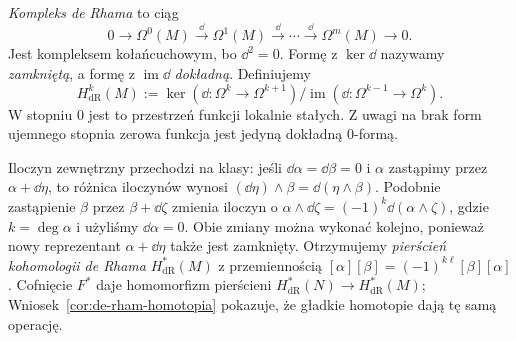 \begin{definicja}
\label{def:de-rham-cohomology}
\emph{Kompleks de Rhama} to ciąg
\[
 0\longrightarrow\Omega^0(M)\xrightarrow{\dd}
 \Omega^1(M)\xrightarrow{\dd}\cdots
 \xrightarrow{\dd}\Omega^m(M)\longrightarrow0.
\]
Jest kompleksem kołańcuchowym, bo $\dd^2=0$.
Formę z $\ker\dd$ nazywamy \emph{zamkniętą},
a formę z $\operatorname{im}\dd$ \emph{dokładną}. Definiujemy
\[
 H^k_{\mathrm{dR}}(M)
 :=\ker(\dd:\Omega^k\to\Omega^{k+1})/
   \operatorname{im}(\dd:\Omega^{k-1}\to\Omega^k).
\]
W stopniu $0$ jest to przestrzeń funkcji lokalnie stałych.
Z uwagi na brak form ujemnego stopnia zerowa funkcja
jest jedyną dokładną $0$-formą.
\end{definicja}

Iloczyn zewnętrzny przechodzi na klasy: jeśli
$\dd\alpha=\dd\beta=0$ i $\alpha$ zastąpimy przez
$\alpha+\dd\eta$, to różnica iloczynów wynosi
$(\dd\eta)\wedge\beta=\dd(\eta\wedge\beta)$.
Podobnie zastąpienie $\beta$ przez $\beta+\dd\zeta$
zmienia iloczyn o
$\alpha\wedge\dd\zeta=(-1)^k\dd(\alpha\wedge\zeta)$,
gdzie $k=\deg\alpha$ i użyliśmy $\dd\alpha=0$.
Obie zmiany można wykonać kolejno, ponieważ nowy
reprezentant $\alpha+\dd\eta$ także jest zamknięty.
Otrzymujemy \emph{pierścień kohomologii de Rhama}
$H^*_{\mathrm{dR}}(M)$ z przemiennością
$[\alpha][\beta]=(-1)^{k\ell}[\beta][\alpha]$.
Cofnięcie $F^*$ daje homomorfizm pierścieni
$H^*_{\mathrm{dR}}(N)\to H^*_{\mathrm{dR}}(M)$;
Wniosek~\ref{cor:de-rham-homotopia} pokazuje, że
gładkie homotopie dają tę samą operację.

